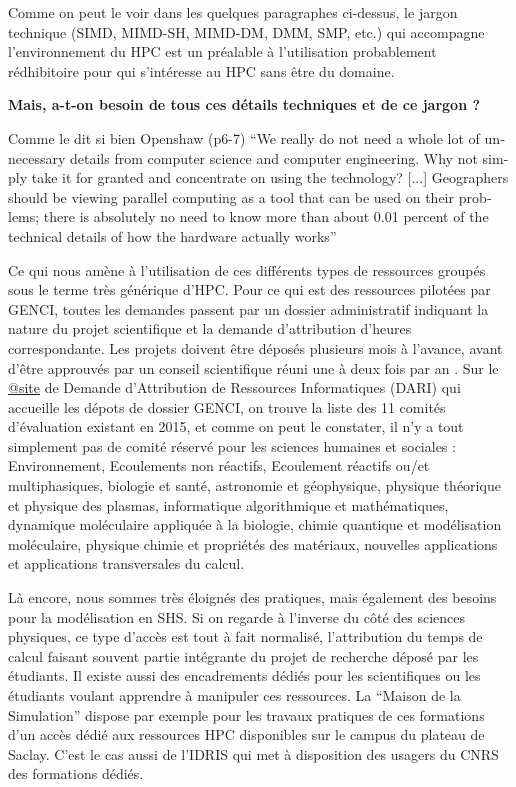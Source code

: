 Comme on peut le voir dans les quelques paragraphes ci-dessus, le jargon technique (SIMD, MIMD-SH, MIMD-DM, DMM, SMP, etc.) qui accompagne l'environnement du HPC est un préalable à l'utilisation probablement rédhibitoire pour qui s'intéresse au HPC sans être du domaine.

\textbf{Mais, a-t-on besoin de tous ces détails techniques et de ce jargon ?}

Comme le dit si bien Openshaw (p6-7) \foreignquote{english}{We really do not need a whole lot of unnecessary details from computer science and computer engineering. Why not simply take it for granted and concentrate on using the technology? [...] Geographers should be viewing parallel computing as a tool that can be used on their problems; there is absolutely no need to know more than about 0.01 percent of the technical details of how the hardware actually works}

Ce qui nous amène à l'utilisation de ces différents types de ressources groupés sous le terme très générique d'HPC. Pour ce qui est des ressources pilotées par GENCI, toutes les demandes passent par un dossier administratif indiquant la nature du projet scientifique et la demande d'attribution d'heures correspondante. Les projets doivent être déposés plusieurs mois à l'avance, avant d'être approuvés par un conseil scientifique réuni une à deux fois par an \autocite{GENCI2015}. Sur le \href{https://www.edari.fr/}{@site} de Demande d'Attribution de Ressources Informatiques (DARI) qui accueille les dépots de dossier GENCI, on trouve la liste des 11 comités d'évaluation existant en 2015, et comme on peut le constater, il n'y a tout simplement pas de comité réservé pour les sciences humaines et sociales : Environnement, Ecoulements non réactifs, Ecoulement réactifs ou/et multiphasiques, biologie et santé, astronomie et géophysique, physique théorique et physique des plasmas, informatique algorithmique et mathématiques, dynamique moléculaire appliquée à la biologie, chimie quantique et modélisation moléculaire, physique chimie et propriétés des matériaux, nouvelles applications et applications transversales du calcul.

Là encore, nous sommes très éloignés des pratiques, mais également des besoins pour la modélisation en SHS. Si on regarde à l'inverse du côté des sciences physiques, ce type d'accès est tout à fait normalisé, l'attribution du temps de calcul faisant souvent partie intégrante du projet de recherche déposé par les étudiants. Il existe aussi des encadrements dédiés pour les scientifiques ou les étudiants voulant apprendre à manipuler ces ressources. La \enquote{Maison de la Simulation} dispose par exemple pour les travaux pratiques de ces formations d'un accès dédié aux ressources HPC disponibles sur le campus du plateau de Saclay. C'est le cas aussi de l'IDRIS qui met à disposition des usagers du CNRS des formations dédiés. 

